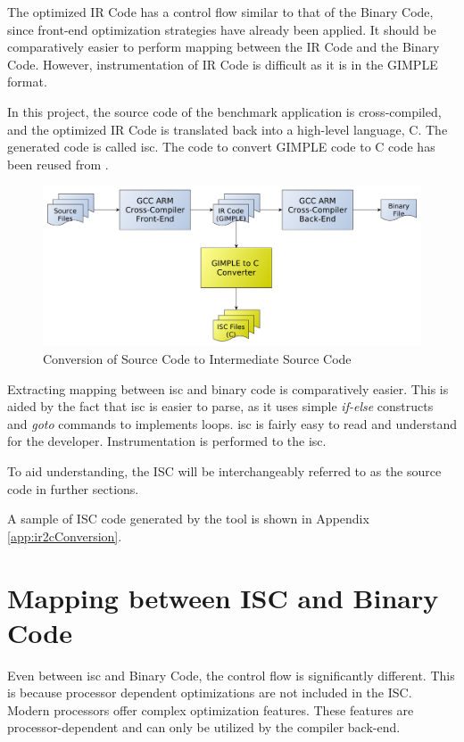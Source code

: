 The optimized IR Code has a control flow similar to that of the Binary Code, since front-end optimization strategies have already been applied. It should be comparatively easier to perform mapping between the IR Code and the Binary Code. However, instrumentation of IR Code is difficult as it is in the GIMPLE format. 

In this project, the source code of the benchmark application is cross-compiled, and the optimized IR Code is translated back into a high-level language, C. The generated code is called \gls{isc}. The code to convert GIMPLE code to C code has been reused from \cite{RBA2013}.

\begin{figure}[h]
\centering
\includegraphics[width=.9\textwidth]{figures/ir2cConversion.pdf}
\caption{Conversion of Source Code to Intermediate Source Code}
\label{fig:ir2cConversion}
\end{figure}

Extracting mapping between \gls{isc} and binary code is comparatively easier. This is aided by the fact that \gls{isc} is easier to parse, as it uses simple \emph{if-else} constructs and \emph{goto} commands to implements loops. \gls{isc} is fairly easy to read and understand for the developer. Instrumentation is performed to the \gls{isc}. 

To aid understanding, the ISC will be interchangeably referred to as the source code in further sections.

A sample of ISC code generated by the tool is shown in Appendix \ref{app:ir2cConversion}.

\section{Mapping between ISC and Binary Code}
Even between \gls{isc} and Binary Code, the control flow is significantly different. This is because processor dependent optimizations are not included in the ISC. Modern processors offer complex optimization features. These features are processor-dependent and can only be utilized by the compiler back-end.

